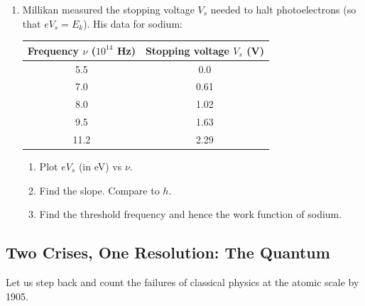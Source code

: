 \documentclass[12pt, a4paper]{book}
\begin{document}
\begin{problembox}
\begin{enumerate}[label=\textbf{\arabic*.}]
  \item Millikan measured the stopping voltage $V_s$ needed
        to halt photoelectrons (so that $eV_s = E_k$).
        His data for sodium:
        \begin{center}
        \begin{tabular}{cc}
        \toprule
        Frequency $\nu$ ($10^{14}$ Hz) & Stopping voltage $V_s$ (V) \\
        \midrule
        5.5 & 0.0 \\
        7.0 & 0.61 \\
        8.0 & 1.02 \\
        9.5 & 1.63 \\
        11.2 & 2.29 \\
        \bottomrule
        \end{tabular}
        \end{center}
        \begin{enumerate}[label=(\alph*)]
          \item Plot $eV_s$ (in eV) vs $\nu$.
          \item Find the slope. Compare to $h$.
          \item Find the threshold frequency and hence
                the work function of sodium.
        \end{enumerate}
\end{enumerate}
\end{problembox}

\subsection{Two Crises, One Resolution: The Quantum}

Let us step back and count the failures of classical physics
at the atomic scale by 1905.
\end{document}
